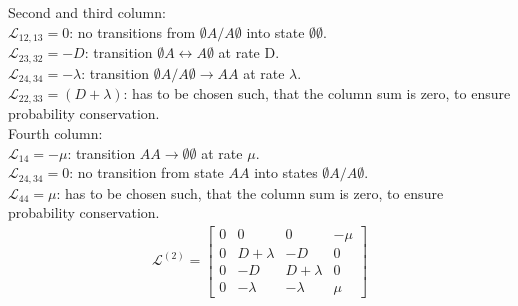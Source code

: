 \documentclass{article}
\begin{document}
Second and third column:\\
$\mathcal{L}_{12,13}=0$: no transitions from $\emptyset A/ A\emptyset$ into state $\emptyset\emptyset$.\\
$\mathcal{L}_{23,32}=-D$: transition  $\emptyset A\leftrightarrow A\emptyset$ at rate D.\\
$\mathcal{L}_{24,34}=-\lambda$: transition $\emptyset A/ A\emptyset\rightarrow AA$ at rate $\lambda$.\\
$\mathcal{L}_{22,33}=(D+\lambda)$: has to be chosen such, that the column sum is zero, to ensure probability conservation.\\

Fourth column:\\
$\mathcal{L}_{14}=-\mu$: transition $AA\rightarrow \emptyset\emptyset$ at rate $\mu$.\\
$\mathcal{L}_{24,34}=0$: no transition from state $AA$ into states $\emptyset A/ A\emptyset$.\\
$\mathcal{L}_{44}=\mu$: has to be chosen such, that the column sum is zero, to ensure probability conservation.
\begin{align}
\mathcal{L}^{(2)}=
    \left[\begin{matrix}0 & 0 & 0 & - \mu\\0 & D + \lambda & - D & 0\\0 & - D & D + \lambda & 0\\0 & - \lambda & - \lambda & \mu\end{matrix}\right]
\end{align}
\end{document}
